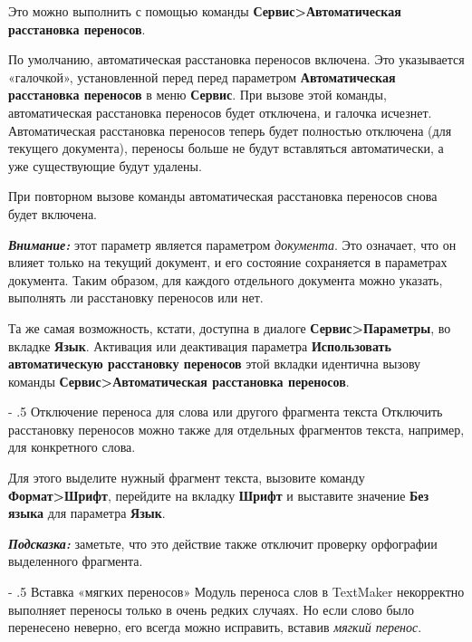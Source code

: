 ﻿\documentclass[a4paper,10pt]{article}
\makeatletter
\renewcommand\paragraph{%
   \@startsection{paragraph}{4}{0mm}%
      {-\baselineskip}%
      {.5\baselineskip}%
      {\normalfont\normalsize\bfseries}}
\makeatother
\begin{document}
Это можно выполнить с помощью команды \textbf{Сервис>Автоматическая расстановка переносов}.

По умолчанию, автоматическая расстановка переносов включена. Это указывается «галочкой», установленной перед перед параметром \textbf{Автоматическая расстановка переносов} в меню \textbf{Сервис}. При вызове этой команды, автоматическая расстановка переносов будет отключена, и галочка исчезнет. Автоматическая расстановка переносов теперь будет полностью отключена (для текущего документа), переносы больше не будут вставляться автоматически, а уже существующие будут удалены.

При повторном вызове команды автоматическая расстановка переносов снова будет включена.

\begin{mdframed}[backgroundcolor=blue!10]
\textbf{\textit{Внимание:}} этот параметр является параметром \textit{документа}. Это означает, что он влияет только на текущий документ, и его состояние сохраняется в параметрах документа. Таким образом, для каждого отдельного документа можно указать, выполнять ли расстановку переносов или нет.
\end{mdframed}

Та же самая возможность, кстати, доступна в диалоге \textbf{Сервис>Параметры}, во вкладке \textbf{Язык}. Активация или деактивация параметра \textbf{Использовать автоматическую расстановку переносов} этой вкладки идентична вызову команды \textbf{Сервис>Автоматическая расстановка переносов}.

\paragraph{Отключение переноса для слова или другого фрагмента текста}
Отключить расстановку переносов можно также для отдельных фрагментов текста, например, для конкретного слова.

Для этого выделите нужный фрагмент текста, вызовите команду \textbf{Формат>Шрифт}, перейдите на вкладку \textbf{Шрифт} и выставите значение \textbf{Без языка} для параметра \textbf{Язык}.

\begin{mdframed}[backgroundcolor=blue!10]
\textbf{\textit{Подсказка:}} заметьте, что это действие также отключит проверку орфографии выделенного фрагмента.
\end{mdframed}

\paragraph{Вставка «мягких переносов»}
Модуль переноса слов в TextMaker некорректно выполняет переносы только в очень редких случаях. Но если слово было перенесено неверно, его всегда можно исправить, вставив \textit{мягкий перенос}.
\end{document}
